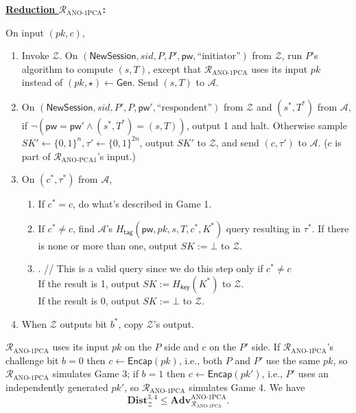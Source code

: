 \documentclass{article}
\theoremstyle{plain}
\theoremstyle{definition}
\theoremstyle{remark}
\newcommand{\adv}{\mathcal{A}}
\newcommand{\env}{\mathcal{Z}}
\newcommand{\red}{\mathcal{R}}
\newcommand{\Adv}{\mathbf{Adv}}
\newcommand{\Dist}{\mathbf{Dist}}
\newcommand{\Gen}{\mathsf{Gen}}
\newcommand{\Encap}{\mathsf{Encap}}
\newcommand{\PC}{\mathsf{PC}}
\newcommand{\Hkey}{H_\mathsf{key}}
\newcommand{\Htag}{H_\mathsf{tag}}
\newcommand{\pw}{\mathsf{pw}}
\newcommand{\NewSession}{\mathsf{NewSession}}
\begin{document}
\medskip\noindent\textbf{\underline{Reduction $\red_\mathrm{ANO\text{-}1PCA}$}:}

\medskip\noindent
On input $(pk,c)$,
\begin{enumerate}
  \item Invoke $\env$. On $(\NewSession, sid, P, P', \pw, \text{``initiator''})$ from $\env$, run $P$'s algorithm to compute $(s,T)$, except that $\red_\text{ANO-1PCA}$ uses its input $pk$ instead of $(pk,\star) \gets \Gen$. Send $(s,T)$ to $\adv$.
  \item On $(\NewSession, sid, P', P, \pw', \text{``respondent''})$ from $\env$ and $(s^*,T^*)$ from $\adv$, if $\neg(\pw = \pw' \land (s^*,T^*) = (s,T))$, output 1 and halt. Otherwise sample $SK' \gets \{0,1\}^n, \tau' \gets \{0,1\}^{2n}$, output $SK'$ to $\env$, and send $(c,\tau')$ to $\adv$. ($c$ is part of $\red_\text{ANO-PCA1}$'s input.)
  \item On $(c^*,\tau^*)$ from $\adv$,
      \begin{enumerate}
        \item If $c^* = c$, do what's described in Game 1.
        \item If $c^* \neq c$, find $\adv$'s $\Htag(\pw,pk,s,T,c^*,K^*)$ query resulting in $\tau^*$. If there is none or more than one, output $SK := \bot$ to $\env$.
        \item \fbox{Query $\PC_{sk}(c^*,K^*)$}. \quad // \textcolor[gray]{0.5}{This is a valid query since we do this step only if $c^* \neq c$} \\
            If the result is 1, output $SK := \Hkey(K^*)$ to $\env$. \\
            If the result is 0, output $SK := \bot$ to $\env$.
      \end{enumerate}
  \item {\color{blue}When $\env$ outputs bit $b^*$, copy $\env$'s output.}
\end{enumerate}

$\red_\text{ANO-1PCA}$ uses its input $pk$ on the $P$ side and $c$ on the $P'$ side. If $\red_\text{ANO-1PCA}$'s challenge bit $b = 0$ then $c \gets \Encap(pk)$, i.e., both $P$ and $P'$ use the same $pk$, so $\red_\text{ANO-1PCA}$ simulates Game 3; if $b = 1$ then $c \gets \Encap(pk')$, i.e., $P'$ uses an independently generated $pk'$, so $\red_\text{ANO-1PCA}$ simulates Game 4. We have
\[
\Dist_\env^{3,4} \leq \Adv_{\red_\text{ANO-1PCA}}^\text{ANO-1PCA}.
\]
\end{document}
